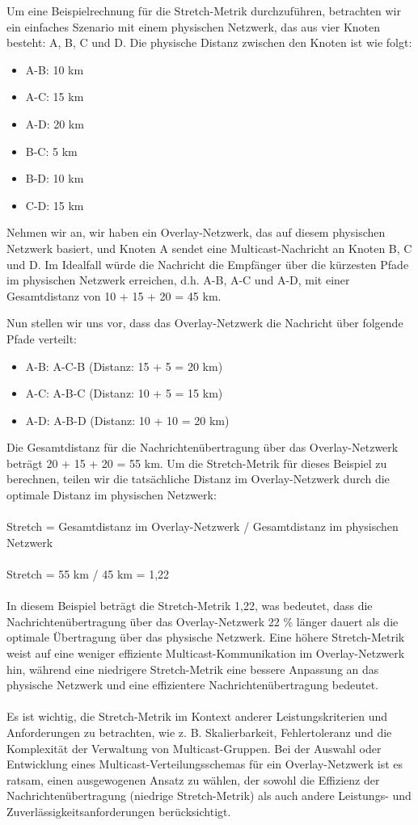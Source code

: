Um eine Beispielrechnung für die Stretch-Metrik durchzuführen, betrachten wir ein einfaches Szenario mit einem physischen Netzwerk, das aus vier Knoten besteht: A, B, C und D. Die physische Distanz zwischen den Knoten ist wie folgt:
\begin{itemize} 
\item A-B: 10 km
\item A-C: 15 km
\item A-D: 20 km
\item B-C: 5 km
\item B-D: 10 km
\item C-D: 15 km
\end{itemize} 
Nehmen wir an, wir haben ein Overlay-Netzwerk, das auf diesem physischen Netzwerk basiert, und Knoten A sendet eine Multicast-Nachricht an Knoten B, C und D. Im Idealfall würde die Nachricht die Empfänger über die kürzesten Pfade im physischen Netzwerk erreichen, d.h. A-B, A-C und A-D, mit einer Gesamtdistanz von 10 + 15 + 20 = 45 km.

Nun stellen wir uns vor, dass das Overlay-Netzwerk die Nachricht über folgende Pfade verteilt:
\begin{itemize} 
\item A-B: A-C-B (Distanz: 15 + 5 = 20 km)
\item A-C: A-B-C (Distanz: 10 + 5 = 15 km)
\item A-D: A-B-D (Distanz: 10 + 10 = 20 km)
\end{itemize} 
Die Gesamtdistanz für die Nachrichtenübertragung über das Overlay-Netzwerk beträgt 20 + 15 + 20 = 55 km. Um die Stretch-Metrik für dieses Beispiel zu berechnen, teilen wir die tatsächliche Distanz im Overlay-Netzwerk durch die optimale Distanz im physischen Netzwerk:
\\\\
Stretch = Gesamtdistanz im Overlay-Netzwerk / Gesamtdistanz im physischen Netzwerk
\\\\
Stretch = 55 km / 45 km = 1,22
\\\\
In diesem Beispiel beträgt die Stretch-Metrik 1,22, was bedeutet, dass die Nachrichtenübertragung über das Overlay-Netzwerk 22 \% länger dauert als die optimale Übertragung über das physische Netzwerk. Eine höhere Stretch-Metrik weist auf eine weniger effiziente Multicast-Kommunikation im Overlay-Netzwerk hin, während eine niedrigere Stretch-Metrik eine bessere Anpassung an das physische Netzwerk und eine effizientere Nachrichtenübertragung bedeutet.
\\\\
Es ist wichtig, die Stretch-Metrik im Kontext anderer Leistungskriterien und Anforderungen zu betrachten, wie z. B. Skalierbarkeit, Fehlertoleranz und die Komplexität der Verwaltung von Multicast-Gruppen. Bei der Auswahl oder Entwicklung eines Multicast-Verteilungsschemas für ein Overlay-Netzwerk ist es ratsam, einen ausgewogenen Ansatz zu wählen, der sowohl die Effizienz der Nachrichtenübertragung (niedrige Stretch-Metrik) als auch andere Leistungs- und Zuverlässigkeitsanforderungen berücksichtigt.

